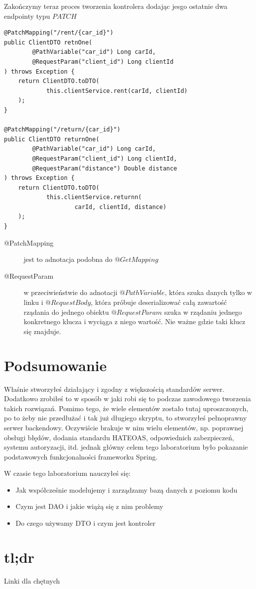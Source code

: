 \documentclass{article}
\begin{document}
                Zakończymy teraz proces tworzenia kontrolera dodając jesgo ostatnie dwa endpointy typu $PATCH$
                \begin{verbatim}
@PatchMapping("/rent/{car_id}")
public ClientDTO retnOne(
        @PathVariable("car_id") Long carId,
        @RequestParam("client_id") Long clientId
) throws Exception {
    return ClientDTO.toDTO(
            this.clientService.rent(carId, clientId)
    );
}

@PatchMapping("/return/{car_id}")
public ClientDTO returnOne(
        @PathVariable("car_id") Long carId,
        @RequestParam("client_id") Long clientId,
        @RequestParam("distance") Double distance
) throws Exception {
    return ClientDTO.toDTO(
            this.clientService.returnn(
                    carId, clientId, distance)
    );
}
                \end{verbatim}
                \begin{description}
                    \item[@PatchMapping] jest to adnotacja podobna do $@GetMapping$ 
                    \item[@RequestParam] w przeciwieństwie do adnotacji $@PathVariable$, która szuka danych tylko w linku i $@RequestBody$, która próbuje deserializować całą zawartość rządania do jednego obiektu $@RequestParam$ szuka w rządaniu jednego konkretnego klucza i wyciąga z niego wartość. Nie ważne gdzie taki klucz się znajduje. 
                \end{description}
    \section{Podsumowanie}
        Właśnie stworzyłeś działający i zgodny z większością standardów serwer. Dodatkowo zrobiłeś to w sposób w jaki robi się to podczas zawodowego tworzenia takich rozwiązań. Pomimo tego, że wiele elementów zostało tutaj uproszczonych, po to żeby nie przedłużać i tak już długiego skryptu, to stworzyłeś pełnoprawny serwer backendowy. Oczywiście brakuje w nim wielu elementów, np. poprawnej obsługi błędów, dodania standardu HATEOAS, odpowiednich zabezpieczeń, systemu autoryzacji, itd. jednak główny celem tego laboratorium było pokazanie podstawowych funkcjonalności frameworku Spring.
        
        W czasie tego laboratorium nauczyłeś się:
        \begin{itemize}
            \item Jak współcześnie modelujemy i zarządzamy bazą danych z poziomu kodu
            \item Czym jest DAO i jakie wiążą się z nim problemy
            \item Do czego używamy DTO i czym jest kontroler
        \end{itemize}
    \section{tl;dr}
        Linki dla chętnych
\end{document}

